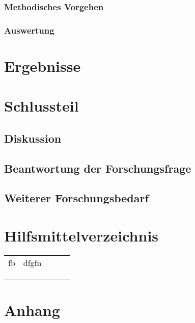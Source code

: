 \documentclass[12pt,a4paper]{article}        %
\begin{document}
\subsubsection{Methodisches Vorgehen}
\subsubsection{Auswertung}
\pagebreak
\section{Ergebnisse}
\pagebreak
\section{Schlussteil}
\subsection{Diskussion}
\subsection{Beantwortung der Forschungsfrage}
\subsection{Weiterer Forschungsbedarf}

\pagebreak

\printbibliography
\section{Hilfsmittelverzeichnis}
\begin{table}[]
\begin{tabular}{lllll}
fb & dfgfn & \\
   &       &  \\
   &       &  \\
   &       & 
\end{tabular}
\end{table}
\section{Anhang}
\end{document}
